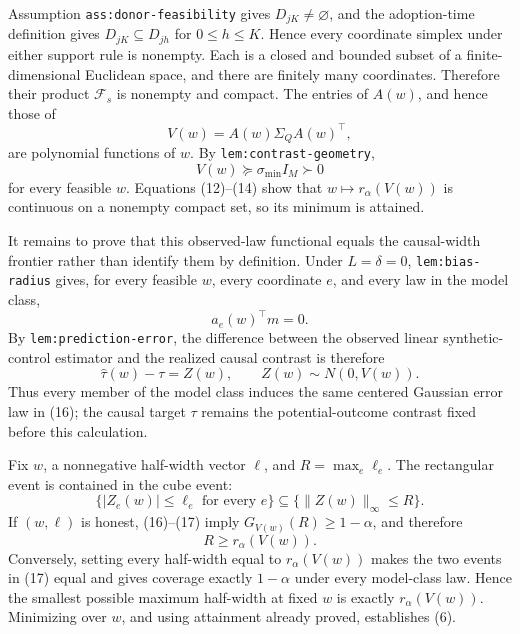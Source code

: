 Assumption \texttt{ass:donor-feasibility} gives
\(D_{jK}\ne\varnothing\), and the adoption-time definition gives
\(D_{jK}\subseteq D_{jh}\) for \(0\leq h\leq K\).  Hence every coordinate
simplex under either support rule is nonempty.  Each is a closed and bounded
subset of a finite-dimensional Euclidean space, and there are finitely many
coordinates.  Therefore their product \(\mathcal F_s\) is nonempty and
compact.  The entries of \(A(w)\), and hence those of
\[
 V(w)=A(w)\Sigma_QA(w)^{\top}, \tag{13}
\]
are polynomial functions of \(w\).  By
\texttt{lem:contrast-geometry},
\[
 V(w)\succeq\sigma_{\min}I_M\succ0 \tag{14}
\]
for every feasible \(w\).  Equations (12)--(14) show that
\(w\mapsto r_\alpha(V(w))\) is continuous on a nonempty compact set, so its
minimum is attained.

It remains to prove that this observed-law functional equals the causal-width
frontier rather than identify them by definition.  Under \(L=\delta=0\),
\texttt{lem:bias-radius} gives, for every feasible \(w\), every coordinate
\(e\), and every law in the model class,
\[
 a_e(w)^{\top}m=0. \tag{15}
\]
By \texttt{lem:prediction-error}, the difference between the observed linear
synthetic-control estimator and the realized causal contrast is therefore
\[
 \widehat\tau(w)-\tau=Z(w),
 \qquad Z(w)\sim N(0,V(w)). \tag{16}
\]
Thus every member of the model class induces the same centered Gaussian
error law in (16); the causal target \(\tau\) remains the potential-outcome
contrast fixed before this calculation.

Fix \(w\), a nonnegative half-width vector \(\ell\), and
\(R=\max_e\ell_e\).  The rectangular event is contained in the cube event:
\[
 \{|Z_e(w)|\leq\ell_e\text{ for every }e\}
 \subseteq\{\lVert Z(w)\rVert_\infty\leq R\}. \tag{17}
\]
If \((w,\ell)\) is honest, (16)--(17) imply
\(G_{V(w)}(R)\geq1-\alpha\), and therefore
\[
 R\geq r_\alpha(V(w)). \tag{18}
\]
Conversely, setting every half-width equal to
\(r_\alpha(V(w))\) makes the two events in (17) equal and gives coverage
exactly \(1-\alpha\) under every model-class law.  Hence the smallest possible
maximum half-width at fixed \(w\) is exactly \(r_\alpha(V(w))\).  Minimizing
over \(w\), and using attainment already proved, establishes (6).

